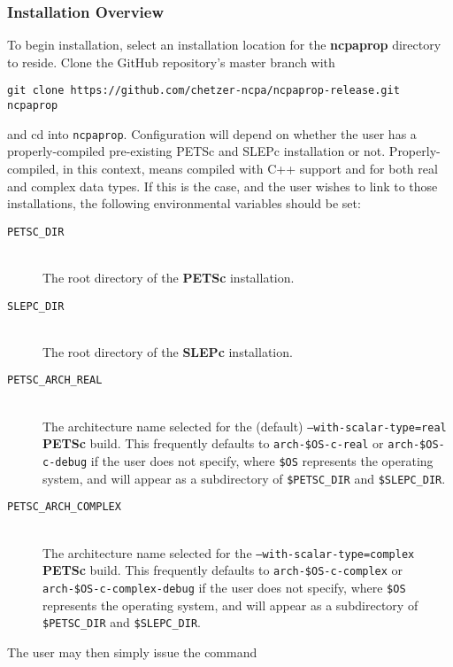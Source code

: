 \subsubsection{Installation Overview}

To begin installation, select an installation location for the \textbf{ncpaprop} directory to reside.  Clone the GitHub repository's master branch with

\texttt{git clone https://github.com/chetzer-ncpa/ncpaprop-release.git ncpaprop}

\noindent
and cd into \texttt{ncpaprop}.  Configuration will depend on whether the user has a properly-compiled pre-existing PETSc and SLEPc installation or not.  Properly-compiled, in this context, means compiled with C++ support and for both real and complex data types.  If this is the case, and the user wishes to link to those installations, the following environmental variables should be set:
\begin{description}
\item[\texttt{PETSC\_DIR}]\hfill \\
\noindent
The root directory of the \textbf{PETSc} installation.

\item[\texttt{SLEPC\_DIR}]\hfill \\
\noindent
The root directory of the \textbf{SLEPc} installation.

\item[\texttt{PETSC\_ARCH\_REAL}]\hfill \\
\noindent
The architecture name selected for the (default) \texttt{--with-scalar-type=real} \textbf{PETSc} build.  This frequently defaults to \texttt{arch-\$OS-c-real} or \texttt{arch-\$OS-c-debug} if the user does not specify, where \texttt{\$OS} represents the operating system, and will appear as a subdirectory of \texttt{\$PETSC\_DIR} and \texttt{\$SLEPC\_DIR}.

\item[\texttt{PETSC\_ARCH\_COMPLEX}]\hfill \\
\noindent
The architecture name selected for the \texttt{--with-scalar-type=complex} \textbf{PETSc} build.  This frequently defaults to \texttt{arch-\$OS-c-complex} or \texttt{arch-\$OS-c-complex-debug} if the user does not specify, where \texttt{\$OS} represents the operating system, and will appear as a subdirectory of \texttt{\$PETSC\_DIR} and \texttt{\$SLEPC\_DIR}.
\end{description}

The user may then simply issue the command

